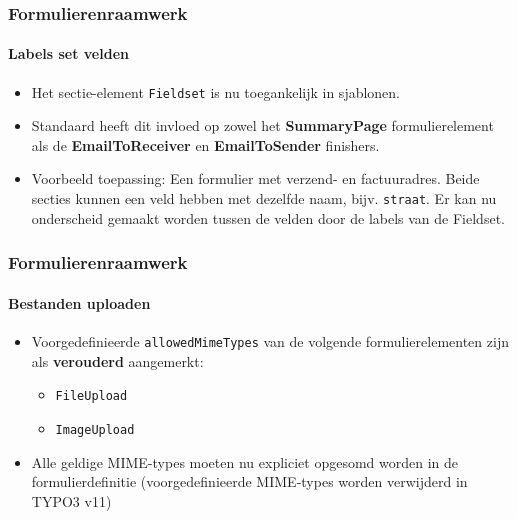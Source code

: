 
\begin{frame}[fragile]
	\frametitle{Formulierenraamwerk}
	\framesubtitle{Labels set velden}

	\begin{itemize}
		\item Het sectie-element \texttt{Fieldset} is nu toegankelijk in sjablonen.
		\item Standaard heeft dit invloed op zowel het \textbf{SummaryPage} formulierelement als de \textbf{EmailToReceiver} en \textbf{EmailToSender} finishers.
		\item Voorbeeld toepassing:\newline
			\small
				Een formulier met verzend- en factuuradres. Beide secties kunnen een veld hebben met dezelfde naam, bijv. \texttt{straat}.
				Er kan nu onderscheid gemaakt worden tussen de velden door de labels van de Fieldset.
			\normalsize

	\end{itemize}

\end{frame}


\begin{frame}[fragile]
	\frametitle{Formulierenraamwerk}
	\framesubtitle{Bestanden uploaden}

	\begin{itemize}
		\item Voorgedefinieerde \texttt{allowedMimeTypes} van de volgende formulierelementen zijn als \textbf{verouderd} aangemerkt:

			\begin{itemize}
				\item \texttt{FileUpload}
				\item \texttt{ImageUpload}
			\end{itemize}

		\item Alle geldige MIME-types moeten nu expliciet opgesomd worden in de formulierdefinitie\newline
			\smaller
				(voorgedefinieerde MIME-types worden verwijderd in TYPO3 v11)
			\normalsize

	\end{itemize}

\end{frame}

